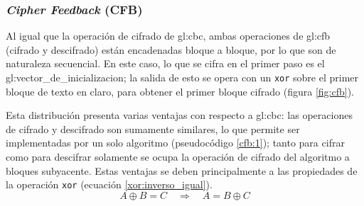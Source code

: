 %
%

\subsubsection{\textit{Cipher Feedback} (CFB)}

Al igual que la operación de cifrado de \gls{gl:cbc}, ambas operaciones
de \gls{gl:cfb} (cifrado y descifrado) están encadenadas bloque a bloque,
por lo que son de naturaleza secuencial. En este caso, lo que se cifra en el
primer paso es el \gls{gl:vector_de_inicializacion}; la salida de esto se opera
con un \verb|xor| sobre el primer bloque de texto en claro, para obtener el
primer bloque cifrado (figura \ref{fig:cfb}).

Esta distribución presenta varias ventajas con respecto a \gls{gl:cbc}:
las operaciones de cifrado y descifrado son sumamente similares, lo que permite
ser implementadas por un solo algoritmo (pseudocódigo \ref{cfb:1}); tanto para
cifrar como para descifrar solamente se ocupa la operación de cifrado del
algoritmo a bloques subyacente. Estas ventajas se deben principalmente a las
propiedades de la operación \verb|xor| (ecuación \ref{xor:inverso_igual}).
\begin{equation}
  \label{xor:inverso_igual}
  A \oplus B = C \quad \Rightarrow \quad A = B \oplus C
\end{equation}

